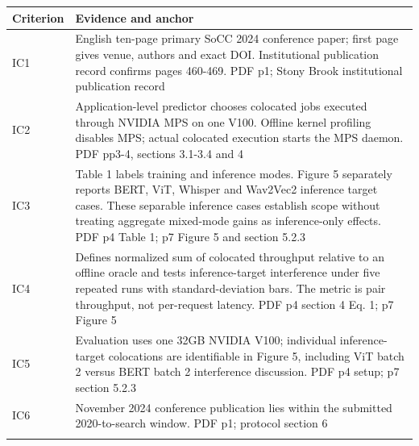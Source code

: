 \begin{longtable}{>{\raggedright\arraybackslash}p{}>{\raggedright\arraybackslash}p{}}
\toprule
\textbf{Criterion} & \textbf{Evidence and anchor}\\\midrule\endhead
IC1 & English ten-page primary SoCC 2024 conference paper;\allowbreak{} first page gives venue,\allowbreak{} authors and exact DOI. Institutional publication record confirms pages 460-469. PDF p1;\allowbreak{} Stony Brook institutional publication record\\\addlinespace
IC2 & Application-level predictor chooses colocated jobs executed through NVIDIA MPS on one V100. Offline kernel profiling disables MPS;\allowbreak{} actual colocated execution starts the MPS daemon. PDF pp3-4,\allowbreak{} sections 3.1-3.4 and 4\\\addlinespace
IC3 & Table 1 labels training and inference modes. Figure 5 separately reports BERT,\allowbreak{} ViT,\allowbreak{} Whisper and Wav2Vec2 inference target cases. These separable inference cases establish scope without treating aggregate mixed-mode gains as inference-only effects. PDF p4 Table 1;\allowbreak{} p7 Figure 5 and section 5.2.3\\\addlinespace
IC4 & Defines normalized sum of colocated throughput relative to an offline oracle and tests inference-target interference under five repeated runs with standard-deviation bars. The metric is pair throughput,\allowbreak{} not per-request latency. PDF p4 section 4 Eq. 1;\allowbreak{} p7 Figure 5\\\addlinespace
IC5 & Evaluation uses one 32GB NVIDIA V100;\allowbreak{} individual inference-target colocations are identifiable in Figure 5,\allowbreak{} including ViT batch 2 versus BERT batch 2 interference discussion. PDF p4 setup;\allowbreak{} p7 section 5.2.3\\\addlinespace
IC6 & November 2024 conference publication lies within the submitted 2020-to-search window. PDF p1;\allowbreak{} protocol section 6\\\addlinespace
\bottomrule\end{longtable}
